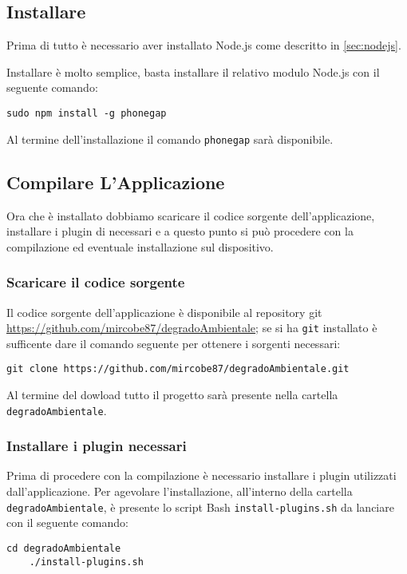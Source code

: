     \subsection{Installare \pg{}}
        Prima di tutto è necessario aver installato Node.js come descritto in 
        \ref{sec:nodejs}.
        
        Installare \pg{} è molto semplice, basta installare il relativo modulo 
        Node.js con il seguente comando:
        \begin{lstlisting}[language=plane]
    sudo npm install -g phonegap
        \end{lstlisting}
        Al termine dell'installazione il comando \texttt{phonegap} sarà 
        disponibile.
        
    \subsection{Compilare L'Applicazione}
        Ora che \pg{} è installato dobbiamo scaricare il codice sorgente 
        dell'applicazione, installare i plugin di \pg{} necessari e a questo 
        punto si può procedere con la compilazione ed eventuale installazione 
        sul dispositivo.
        
        \subsubsection{Scaricare il codice sorgente}
            Il codice sorgente dell'applicazione \pg{} è disponibile al 
            repository git 
            \url{https://github.com/mircobe87/degradoAmbientale}; se si ha 
            \texttt{git} installato è sufficente dare il comando seguente per 
            ottenere i sorgenti necessari:
            \begin{lstlisting}[language=plane]
    git clone https://github.com/mircobe87/degradoAmbientale.git
            \end{lstlisting}
            Al termine del dowload tutto il progetto sarà presente nella 
            cartella \texttt{degradoAmbientale}.
            
        \subsubsection{Installare i plugin necessari}
            Prima di procedere con la compilazione è necessario installare i 
            plugin utilizzati dall'applicazione. Per agevolare 
            l'installazione, all'interno della cartella 
            \texttt{degradoAmbientale}, è presente lo script Bash 
            \texttt{install-plugins.sh} da lanciare con il seguente comando:
            \begin{lstlisting}[language=plane]
    cd degradoAmbientale
    ./install-plugins.sh
            \end{lstlisting}
            
